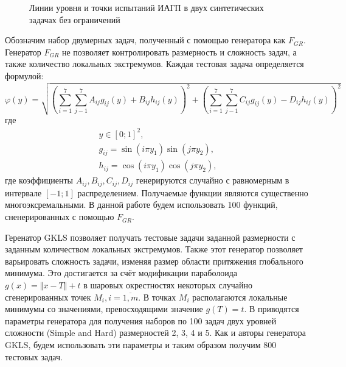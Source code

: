 \begin{figure}[ht]
  \centering
  \caption{Линии уровня и точки испытаний ИАГП в двух синтетических задачах без ограничений}
  \label{fig:isolines_unconstrained}
\end{figure}

Обозначим набор двумерных задач, полученный с помощью генератора \cite{grishaginClass}
как \(F_{GR}\). Генератор \(F_{GR}\) не позволяет контролировать размерность и сложность задач, а также количество локальных экстремумов.
Каждая тестовая задача определяется формулой:
\begin{displaymath}
  \varphi(y)=\sqrt{\left(\sum_{i=1}^7\sum_{j-1}^7 A_{ij}g_{ij}(y)+ B_{ij}h_{ij}(y)\right)^2+\left(\sum_{i=1}^7\sum_{j-1}^7 C_{ij}g_{ij}(y) - D_{ij}h_{ij}(y)\right)^2}
\end{displaymath}
где
\begin{displaymath}
  \begin{array}{cr}
    y\in[0;1]^2, \\
    g_{ij}=\sin(i\pi y_1)\sin(j\pi y_2), \\
    h_{ij}=\cos(i\pi y_1)\cos(j\pi y_2),
  \end{array}
\end{displaymath}
где коэффициенты \(A_{ij},B_{ij}, C_{ij}, D_{ij}\) генерируются случайно с равномерным в
интервале \([-1;1]\) распределением.
Получаемые функции являются существенно многоэксремальными. В данной работе будем использовать 100 функций, сненерированных с помощью \(F_{GR}\).

Геренатор GKLS \cite{Gaviano2003} позволяет получать тестовые задачи заданной размерности с заданным количеством локальных
экстремумов. Также этот генератор позволяет варьировать сложность задачи, изменяя размер области притяжения
глобального минимума. Это достигается за счёт модификации параболоида \(g(x)=\Vert x-T\Vert + t\) в
шаровых окрестностях некоторых случайно сгенерированных точек \(M_i, i=\overline{1,m}\). В точках
\(M_i\) располагаются локальные минимумы со значениями, превосходящими значение \(g(T)=t\).
В \cite{SergeyevKvasov2006} приводятся параметры генератора для получения 
наборов по 100 задач двух уровней сложности (Simple and Hard) размерностей 2, 3, 4 и 5.
Как и авторы генератора GKLS, будем использовать эти параметры и таким образом получим 800 тестовых задач.

